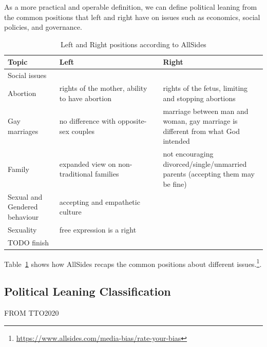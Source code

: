 As a more practical and operable definition, we can define political leaning from the common positions that left and right have on issues such as economics, social policies, and governance.


\begin{table}[ht]
    \centering
    \begin{tabular}{p{0.2\linewidth} | p{0.4\linewidth} | p{0.4\linewidth}}
      Topic  & Left & Right \\ \hline
      Social issues & \\
      Abortion & rights of the mother, ability to have abortion & rights of the fetus, limiting and stopping abortions \\
      Gay marriages & no difference with opposite-sex couples & marriage between man and woman, gay marriage is different from what God intended \\
      Family & expanded view on non-traditional families & not encouraging divorced/single/unmarried parents (accepting them may be fine) \\
      Sexual and Gendered behaviour & accepting and empathetic culture & \\
      Sexuality & free expression is a right & \\
      TODO finish
    \end{tabular}
    \caption{Left and Right positions according to AllSides}
    \label{tab:allsides_leaning_positions}
\end{table}

Table~\ref{tab:allsides_leaning_positions} shows how AllSides recaps the common positions about different issues.\footnote{\url{https://www.allsides.com/media-bias/rate-your-bias}}.




\subsection{Political Leaning Classification}
\label{ssec:lit_leaning_classification}

FROM TTO2020


